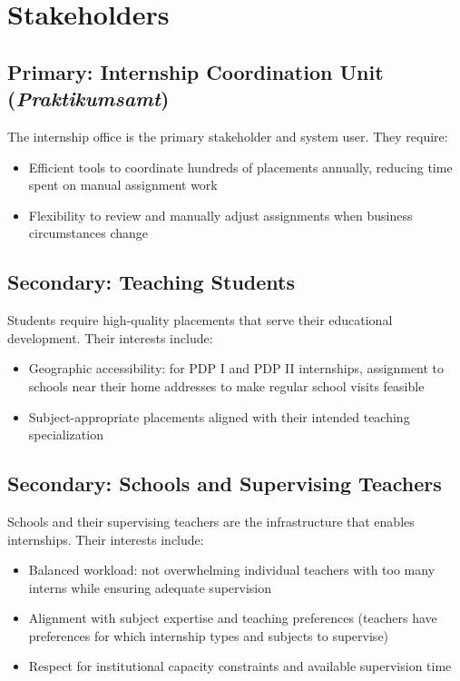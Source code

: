 \documentclass[12pt,a4paper]{report}
\begin{document}
\section{Stakeholders}

\subsection{Primary: Internship Coordination Unit (\textit{Praktikumsamt})}

The internship office is the primary stakeholder and system user. They require:
\begin{itemize}
    \item Efficient tools to coordinate hundreds of placements annually, reducing time spent on manual assignment work
    \item Flexibility to review and manually adjust assignments when business circumstances change
\end{itemize}

\subsection{Secondary: Teaching Students}

Students require high-quality placements that serve their educational development. Their interests include:
\begin{itemize}
    \item Geographic accessibility: for PDP I and PDP II internships, assignment to schools near their home addresses to make regular school visits feasible
    \item Subject-appropriate placements aligned with their intended teaching specialization
\end{itemize}

\subsection{Secondary: Schools and Supervising Teachers}

Schools and their supervising teachers are the infrastructure that enables internships. Their interests include:
\begin{itemize}
    \item Balanced workload: not overwhelming individual teachers with too many interns while ensuring adequate supervision
    \item Alignment with subject expertise and teaching preferences (teachers have preferences for which internship types and subjects to supervise)
    \item Respect for institutional capacity constraints and available supervision time
\end{itemize}
\end{document}
